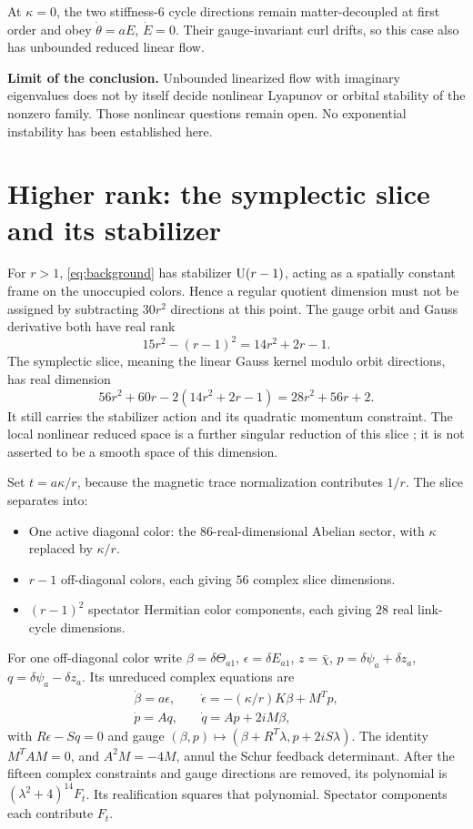 \documentclass[11pt,a4paper]{article}
\begin{document}
At $\kappa=0$, the two stiffness-$6$ cycle directions remain matter-decoupled at first order and obey $\dot\theta=aE$, $\dot E=0$. Their gauge-invariant curl drifts, so this case also has unbounded reduced linear flow.

\textbf{Limit of the conclusion.} Unbounded linearized flow with imaginary eigenvalues does not by itself decide nonlinear Lyapunov or orbital stability of the nonzero family. Those nonlinear questions remain open. No exponential instability has been established here.

\newpage
\section{Higher rank: the symplectic slice and its stabilizer}
For $r>1$, \eqref{eq:background} has stabilizer $\mathrm U(r-1)$, acting as a spatially constant frame on the unoccupied colors. Hence a regular quotient dimension must not be assigned by subtracting $30r^2$ directions at this point. The gauge orbit and Gauss derivative both have real rank
\[
15r^2-(r-1)^2=14r^2+2r-1.
\]
The symplectic slice, meaning the linear Gauss kernel modulo orbit directions, has real dimension
\begin{equation}
56r^2+60r-2(14r^2+2r-1)=28r^2+56r+2.
\end{equation}
It still carries the stabilizer action and its quadratic momentum constraint. The local nonlinear reduced space is a further singular reduction of this slice \cite{OrtegaRatiu}; it is not asserted to be a smooth space of this dimension.

Set $t=a\kappa/r$, because the magnetic trace normalization contributes $1/r$. The slice separates into:
\begin{itemize}
\item One active diagonal color: the $86$-real-dimensional Abelian sector, with $\kappa$ replaced by $\kappa/r$.
\item $r-1$ off-diagonal colors, each giving $56$ complex slice dimensions.
\item $(r-1)^2$ spectator Hermitian color components, each giving $28$ real link-cycle dimensions.
\end{itemize}
For one off-diagonal color write $\beta=\delta\Theta_{a1}$, $\epsilon=\delta E_{a1}$, $z=\bar\chi$, $p=\delta\psi_a+\delta z_a$, $q=\delta\psi_a-\delta z_a$. Its unreduced complex equations are
\begin{align*}
\dot\beta=a\epsilon,\quad&\dot\epsilon=-(\kappa/r)K\beta+M^Tp,\\
\dot p=Aq,\quad&\dot q=Ap+2iM\beta,
\end{align*}
with $R\epsilon-Sq=0$ and gauge $(\beta,p)\mapsto(\beta+R^T\lambda,p+2iS\lambda)$.
The identity $M^TAM=0$, and $A^2M=-4M$, annul the Schur feedback determinant. After the fifteen complex constraints and gauge directions are removed, its polynomial is $(\lambda^2+4)^{14}F_t$. Its realification squares that polynomial. Spectator components each contribute $F_t$.
\end{document}
